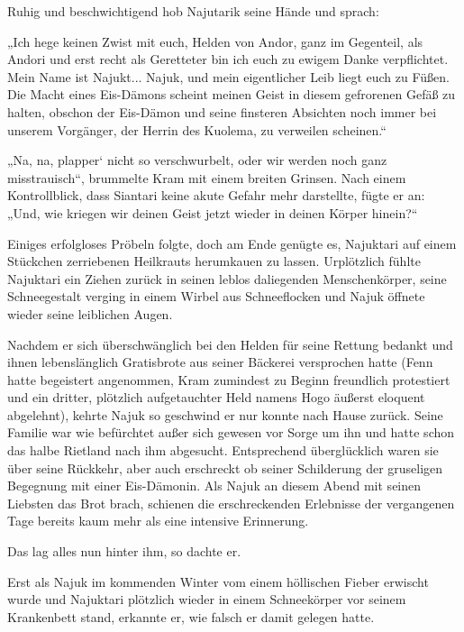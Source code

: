 \documentclass[10pt, a4paper, oneside]{book}
\begin{document}
Ruhig und beschwichtigend hob Najutarik seine Hände und sprach: 

„Ich hege keinen Zwist mit euch, Helden von Andor, ganz im Gegenteil, als Andori und erst recht als Geretteter bin ich euch zu ewigem Danke verpflichtet. Mein Name ist Najukt... Najuk, und mein eigentlicher Leib liegt euch zu Füßen. Die Macht eines Eis-Dämons scheint meinen Geist in diesem gefrorenen Gefäß zu halten, obschon der Eis-Dämon und seine finsteren Absichten noch immer bei unserem Vorgänger, der Herrin des Kuolema, zu verweilen scheinen.“

„Na, na, plapper‘ nicht so verschwurbelt, oder wir werden noch ganz misstrauisch“, brummelte Kram mit einem breiten Grinsen. Nach einem Kontrollblick, dass Siantari keine akute Gefahr mehr darstellte, fügte er an: „Und, wie kriegen wir deinen Geist jetzt wieder in deinen Körper hinein?“

Einiges erfolgloses Pröbeln folgte, doch am Ende genügte es, Najuktari auf einem Stückchen zerriebenen Heilkrauts herumkauen zu lassen. Urplötzlich fühlte Najuktari ein Ziehen zurück in seinen leblos daliegenden Menschenkörper, seine Schneegestalt verging in einem Wirbel aus Schneeflocken und Najuk öffnete wieder seine leiblichen Augen. 

Nachdem er sich überschwänglich bei den Helden für seine Rettung bedankt und ihnen lebenslänglich Gratisbrote aus seiner Bäckerei versprochen hatte (Fenn hatte begeistert angenommen, Kram zumindest zu Beginn freundlich protestiert und ein dritter, plötzlich aufgetauchter Held namens Hogo äußerst eloquent abgelehnt), kehrte Najuk so geschwind er nur konnte nach Hause zurück. Seine Familie war wie befürchtet außer sich gewesen vor Sorge um ihn und hatte schon das halbe Rietland nach ihm abgesucht. Entsprechend überglücklich waren sie über seine Rückkehr, aber auch erschreckt ob seiner Schilderung der gruseligen Begegnung mit einer Eis-Dämonin. Als Najuk an diesem Abend mit seinen Liebsten das Brot brach, schienen die erschreckenden Erlebnisse der vergangenen Tage bereits kaum mehr als eine intensive Erinnerung. 

Das lag alles nun hinter ihm, so dachte er.

Erst als Najuk im kommenden Winter vom einem höllischen Fieber erwischt wurde und Najuktari plötzlich wieder in einem Schneekörper vor seinem Krankenbett stand, erkannte er, wie falsch er damit gelegen hatte.
\end{document}
